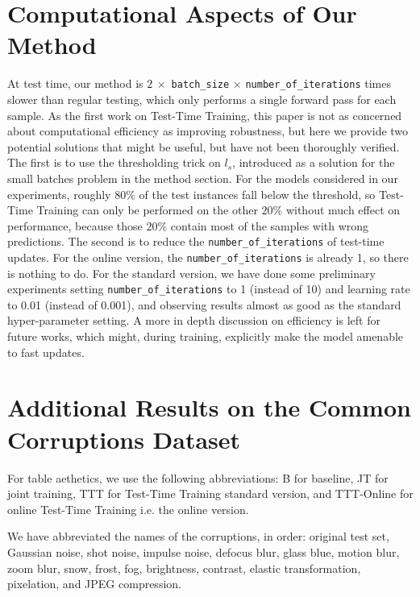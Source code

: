 \section{Computational Aspects of Our Method}
\label{computational}
At test time, our method is $2~\times$
\texttt{batch\_size}
$\times$
\texttt{number\_of\_iterations} 
times slower than regular testing, 
which only performs a single forward pass for each sample. 
As the first work on Test-Time Training, this paper is not as concerned about computational efficiency as improving robustness, but here we provide two potential solutions that might be useful, but have not been thoroughly verified.
The first is to use the thresholding trick on $l_s$, introduced as a solution for the small batches problem in the method section. For the models considered in our experiments, roughly $80\%$ of the test instances fall below the threshold, so Test-Time Training can only be performed on the other $20\%$ without much effect on performance, because those $20\%$ contain most of the samples with wrong predictions.
The second is to reduce the \texttt{number\_of\_iterations} of test-time updates. For the online version, the \texttt{number\_of\_iterations} is already 1, so there is nothing to do. For the standard version, we have done some preliminary experiments setting \texttt{number\_of\_iterations} to 1 (instead of 10) and learning rate to 0.01 (instead of 0.001), and observing results almost as good as the standard hyper-parameter setting.
A more in depth discussion on efficiency is left for future works, which might, during training, explicitly make the model amenable to fast updates.



\pagebreak

\section{Additional Results on the Common Corruptions Dataset}
\label{results_additional}
For table aethetics, we use the following abbreviations:
B for baseline, JT for joint training, TTT for Test-Time Training standard version, and TTT-Online for online Test-Time Training i.e. the online version.

We have abbreviated the names of the corruptions, in order: original test set, Gaussian noise, shot noise, impulse noise, defocus blur, glass blue, motion blur, zoom blur, snow, frost, fog, brightness, contrast, elastic transformation, pixelation, and JPEG compression. 

